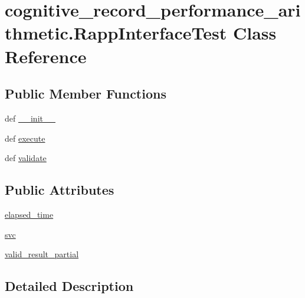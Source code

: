 \hypertarget{classcognitive__record__performance__arithmetic_1_1RappInterfaceTest}{\section{cognitive\-\_\-record\-\_\-performance\-\_\-arithmetic.\-Rapp\-Interface\-Test Class Reference}
\label{classcognitive__record__performance__arithmetic_1_1RappInterfaceTest}
}
\subsection*{Public Member Functions}
\begin{DoxyCompactItemize}
\item 
def \hyperlink{classcognitive__record__performance__arithmetic_1_1RappInterfaceTest_a8780df20341b5a17cf3df07470783a1d}{\-\_\-\-\_\-init\-\_\-\-\_\-}
\item 
def \hyperlink{classcognitive__record__performance__arithmetic_1_1RappInterfaceTest_ae61a38ced4ec30bf06401486e8a9bfa5}{execute}
\item 
def \hyperlink{classcognitive__record__performance__arithmetic_1_1RappInterfaceTest_a9a9b9d9a8d70c4b1ae789376c001314a}{validate}
\end{DoxyCompactItemize}
\subsection*{Public Attributes}
\begin{DoxyCompactItemize}
\item 
\hyperlink{classcognitive__record__performance__arithmetic_1_1RappInterfaceTest_a279653e7e0e82d78e2325e880e097fb6}{elapsed\-\_\-time}
\item 
\hyperlink{classcognitive__record__performance__arithmetic_1_1RappInterfaceTest_a8ee33d88404903570d430b5f29d382c3}{svc}
\item 
\hyperlink{classcognitive__record__performance__arithmetic_1_1RappInterfaceTest_a538bdab11a37475593b39ce725c06d4b}{valid\-\_\-result\-\_\-partial}
\end{DoxyCompactItemize}


\subsection{Detailed Description}


